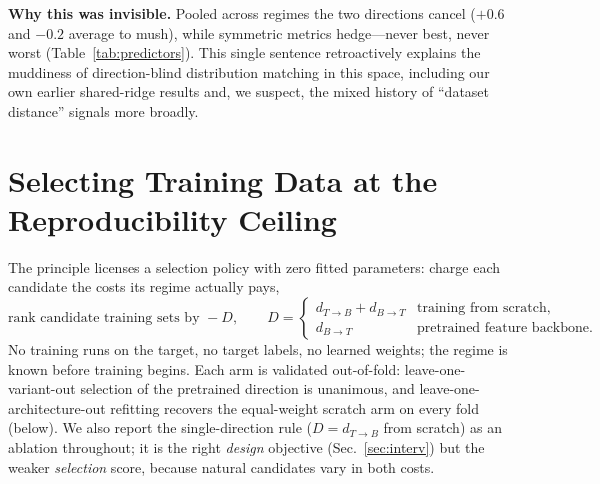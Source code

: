 \documentclass[runningheads]{llncs}
\newcommand{\dtb}{d_{T\to B}}
\newcommand{\dbt}{d_{B\to T}}
\begin{document}
\noindent\textbf{Why this was invisible.}
Pooled across regimes the two directions cancel ($+0.6$ and $-0.2$ average to
mush), while symmetric metrics hedge---never best, never worst
(Table~\ref{tab:predictors}). This single sentence retroactively explains the
muddiness of direction-blind distribution matching in this space, including
our own earlier shared-ridge results and, we suspect, the mixed history of
``dataset distance'' signals more broadly.

\section{Selecting Training Data at the Reproducibility Ceiling}
\label{sec:predict}

The principle licenses a selection policy with zero fitted parameters:
charge each candidate the costs its regime actually pays,
\begin{equation}
\text{rank candidate training sets by } -D, \qquad
D =
\begin{cases}
\dtb + \dbt & \text{training from scratch,}\\[2pt]
\dbt & \text{pretrained feature backbone.}
\end{cases}
\label{eq:rule}
\end{equation}
No training runs on the target, no target labels, no learned weights; the
regime is known before training begins. Each arm is validated out-of-fold:
leave-one-variant-out selection of the pretrained direction is unanimous,
and leave-one-architecture-out refitting recovers the equal-weight scratch
arm on every fold (below). We also report the single-direction rule
($D{=}\dtb$ from scratch) as an ablation throughout; it is the right
\emph{design} objective (Sec.~\ref{sec:interv}) but the weaker
\emph{selection} score, because natural candidates vary in both costs.

\begin{table}[t]
\centering
\caption{\textbf{Within-context ranking, all predictor families, pooled over
the nine variants} (within-context Spearman $\rho$; 95\% bootstrap CIs in
supp.). The regime-aware policy of Eq.~(\ref{eq:rule}) is best on every
protocol, and its margins decompose exactly as the two-cost reading says
they should: it beats summed-distance-everywhere because under a backbone it drops
the forgiven cost ($+0.61$ vs.\ $+0.39$ in the pretrained regime), and it
beats matched-direction-everywhere because from scratch both costs are real
($+0.50$ vs.\ $+0.42$ in the scratch regime). Each fixed single direction
collapses on the regime whose cost structure it mismatches; the learned
ridge, fit across regimes, is diluted by the sign flip; appearance carries
no within-context signal.}
\label{tab:predictors}
\small
\setlength{\tabcolsep}{4.5pt}

\end{table}
\end{document}

